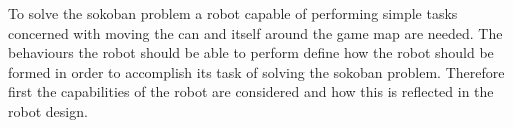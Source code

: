 To solve the sokoban problem a robot capable of performing simple tasks concerned with moving the can and itself around the game map are needed.
The behaviours the robot should be able to perform define how the robot should be formed in order to accomplish its task of solving the sokoban problem.
Therefore first the capabilities of the robot are considered and how this is reflected in the robot design.